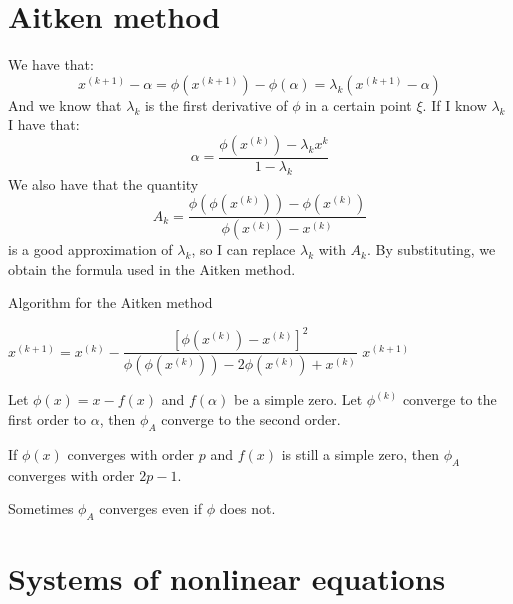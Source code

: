 \documentclass[12pt, a4paper]{report}
\newtheorem[style=M,bodystyle=\normalfont]{theorem}{Theorem}
\newtheorem[style=M,bodystyle=\normalfont]{proposition}{Proposition}
\newtheorem[style=M,bodystyle=\normalfont]{corollary}{Corollary}
\newtheorem[style=M,bodystyle=\normalfont]{lemma}{Lemma}
\newtheorem[style=M,bodystyle=\normalfont]{definition}{Definition}
\begin{document}
    \section{Aitken method}
    We have that: 
    \[x^{(k+1)}-\alpha=\phi(x^{(k+1)})-\phi(\alpha)=\lambda_k\left( x^{(k+1)}-\alpha \right)\]
    And we know that $\lambda_k$ is the first derivative of $\phi$ in a certain point $\xi$. If I know $\lambda_k$ I have that: 
    \[\alpha=\dfrac{\phi(x^{(k)})-\lambda_k x^{k}}{1-\lambda_k}\]
    We also have that the quantity 
    \[A_k=\dfrac{\phi(\phi(x^{(k)}))-\phi(x^{(k)})}{\phi(x^{(k)})-x^{(k)}}\]
    is a good approximation of $\lambda_k$, so I can replace $\lambda_k$ with $A_k$. By substituting, we obtain the formula used in the Aitken method. 
    \begin{algorithm}[H]
        \caption{Algorithm for the Aitken method}
            \begin{algorithmic}[1]
                    \State $x^{(k+1)}=x^{(k)}-\dfrac{\left[ \phi(x^{(k)})-x^{(k)} \right]^2}{\phi(\phi(x^{(k)}))-2\phi(x^{(k)})+x^{(k)}}$
                        \State \Return $x^{(k+1)}$
                    \EndIf
                \EndFor
            \end{algorithmic}
    \end{algorithm}
    \begin{theorem}
        Let $\phi(x)=x-f(x)$ and $f(\alpha)$ be a simple zero. Let $\phi^{(k)}$ converge to the first order to $\alpha$, then $\phi_A$ converge to the second order. 

        If $\phi(x)$ converges with order $p$ and $f(x)$ is still a simple zero, then $\phi_A$ converges with order $2p-1$. 
    \end{theorem}
    Sometimes $\phi_A$ converges even if $\phi$ does not. 

    \section{Systems of nonlinear equations}
\end{document}
